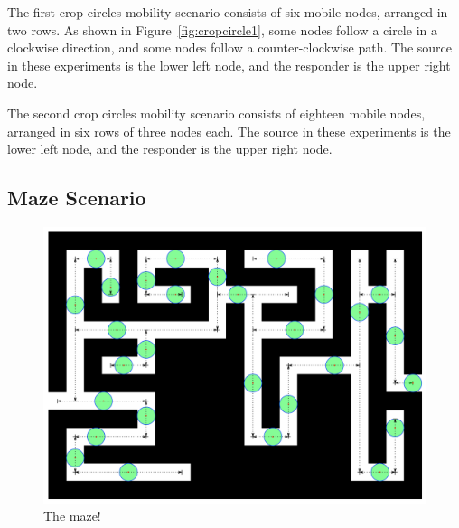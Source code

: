The first crop circles mobility scenario consists of six mobile nodes, arranged in two rows. As shown in 
Figure~\ref{fig:cropcircle1}, some nodes follow a circle in a clockwise direction, and some nodes follow a counter-clockwise path. The source in these experiments is the lower left node, and the responder is the upper right node.



The second crop circles mobility scenario consists of eighteen mobile nodes, arranged in six rows of three nodes each. The source in these experiments is the lower left node, and the responder is the upper right node.


\subsection{Maze Scenario}
\begin{figure}
\begin{center}
\includegraphics[width=.9\columnwidth]{figures/maze_diagram.pdf}
\end{center}
\caption{The maze!}
\label{fig:maze}
\end{figure}